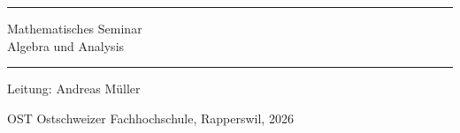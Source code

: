 %
%
\pagestyle{fancy}
\frontmatter
\newcommand\HRule{\noindent\rule{\linewidth}{1.5pt}}
\begin{titlepage}
\HRule
\vspace*{5pt}
\begin{flushright}
{
\LARGE
Mathematisches Seminar\\
\vspace*{20pt}
\Huge
Algebra und Analysis%
}%
\vspace*{5pt}
\end{flushright}
\HRule
\begin{flushright}
\vspace{60pt}
\Large
Leitung: Andreas Müller\\
\vspace{40pt}
\Large

\end{flushright}
\begin{center}
OST Ostschweizer Fachhochschule, Rapperswil, 2026
\end{center}
\end{titlepage}
